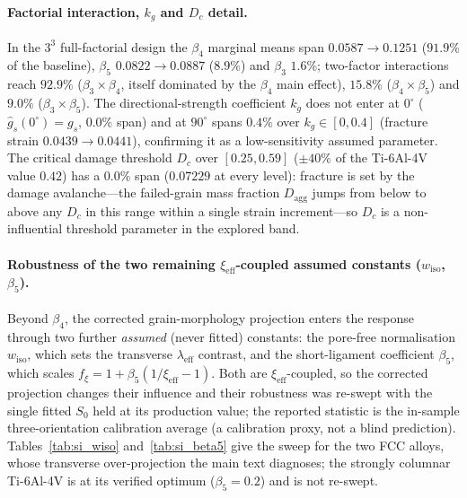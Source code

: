 \documentclass[11pt,a4paper,twocolumn]{article}
\providecommand{\ang}[1]{\ensuremath{#1^{\circ}}}
\begin{document}
\paragraph{Factorial interaction, $k_g$ and $D_c$ detail.}
In the $3^3$ full-factorial design the $\beta_4$ marginal means span $0.0587\to0.1251$ ($91.9\%$ of the baseline),
$\beta_5$ $0.0822\to0.0887$ ($8.9\%$) and $\beta_3$ $1.6\%$; two-factor interactions reach $92.9\%$
($\beta_3\times\beta_4$, itself dominated by the $\beta_4$ main effect), $15.8\%$ ($\beta_4\times\beta_5$) and $9.0\%$
($\beta_3\times\beta_5$). The directional-strength coefficient $k_g$ does not enter at $\ang{0}$
($\hat g_s(0^\circ)=g_s$, $0.0\%$ span) and at $\ang{90}$ spans $0.4\%$ over $k_g\in[0,0.4]$ (fracture strain
$0.0439\to0.0441$), confirming it as a low-sensitivity assumed parameter. The critical damage threshold $D_c$ over
$[0.25,0.59]$ ($\pm40\%$ of the Ti-6Al-4V value $0.42$) has a $0.0\%$ span ($0.07229$ at every level): fracture is set
by the damage avalanche---the failed-grain mass fraction $D_{\mathrm{agg}}$ jumps from below to above any $D_c$ in this
range within a single strain increment---so $D_c$ is a non-influential threshold parameter in the explored band.

\paragraph{Robustness of the two remaining $\xi_{\mathrm{eff}}$-coupled assumed constants ($w_{\mathrm{iso}}$, $\beta_5$).}
Beyond $\beta_4$, the corrected grain-morphology projection enters the response through two further \emph{assumed} (never fitted) constants: the pore-free normalisation $w_{\mathrm{iso}}$, which sets the transverse $\lambda_{\mathrm{eff}}$ contrast, and the short-ligament coefficient $\beta_5$, which scales $f_\xi = 1 + \beta_5(1/\xi_{\mathrm{eff}} - 1)$. Both are $\xi_{\mathrm{eff}}$-coupled, so the corrected projection changes their influence and their robustness was re-swept with the single fitted $S_0$ held at its production value; the reported statistic is the in-sample three-orientation calibration average (a calibration proxy, not a blind prediction). Tables~\ref{tab:si_wiso} and~\ref{tab:si_beta5} give the sweep for the two FCC alloys, whose transverse over-projection the main text diagnoses; the strongly columnar Ti-6Al-4V is at its verified optimum ($\beta_5 = 0.2$) and is not re-swept.
\end{document}
